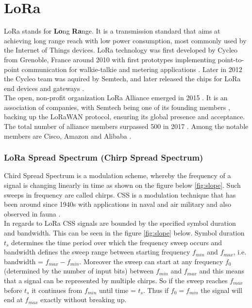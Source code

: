 \chapter{LoRa}

LoRa stands for \textbf{Lo}ng \textbf{Ra}nge. It is a transmission standard that aims at achieving long range reach with low power consumption, most commonly used by the Internet of Things devices. LoRa technology was first developed by Cycleo from Grenoble, France around 2010 with first prototypes implementing point-to-point communication for walkie-talkie and metering applications \cite{trinity_panel}. Later in 2012 the Cycleo team was aquired by Semtech, and later released the chips for LoRa end devices and gateways \cite{origins}. \\

The open, non-profit organization LoRa Alliance emerged in 2015 \cite{alliance}. It is an association of companies, with Semtech being one of its founding members \cite{alliance_founder}, backing up the LoRaWAN protocol, ensuring its global presence and acceptance. The total number of alliance members surpassed 500 in 2017 \cite{500_members}. Among the notable members are Cisco, Amazon and Alibaba \cite{alliance_members}. 

\subsection{LoRa Spread Spectrum (Chirp Spread Spectrum)}


Chird Spread Spectrum is a modulation scheme, whereby the frequency of a signal is changing linearly in time \cite{ieee_2007} as shown on the figure below \ref{fig:slope}. Such sweeps in frequency are called chirps. CSS is a modulation technique that has been around since 1940s
\cite{semtech_spec} with applications in naval and air military and also observed in fauna \cite{origins}.\\

In regards to LoRa CSS signals are bounded by the specified symbol duration and bandwidth. This can be seen in the figure \ref{fig:slope} below. Symbol duration $t_s$ determines the time period over which the frequency sweep occurs and bandwidth defines the sweep range between starting frequency $f_{min}$ and $f_{max}$, i.e. bandwidth = $f_{max} - f_{min}$. Moreover the sweep can start at any frequency $f_0$ (determined by the number of input bits) between $f_{min}$ and $f_{max}$ and this means that a signal can be represented by multiple chirps. So if the sweep reaches $f_{max}$ before $t_s$ it 
continues from $f_{min}$ until time = $t_s$. Thus if $f_0 = f_{min}$
the signal will end at $f_{max}$ exactly without breaking up. 

